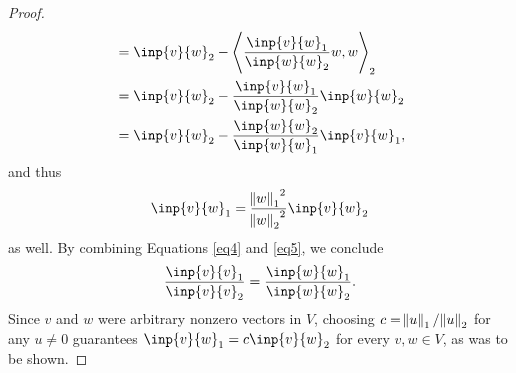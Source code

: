 \documentclass{extarticle}
\begin{document}
\begin{proof}
\begin{align*}
&= \inp{v}{w}_2 - \left\langle \frac{\inp{v}{w}_1}{\inp{w}{w}_2}w, w \right\rangle_2\\
&= \inp{v}{w}_2 - \frac{\inp{v}{w}_1}{\inp{w}{w}_2}\inp{w}{w}_2\\
&= \inp{v}{w}_2 - \frac{\inp{w}{w}_2}{\inp{w}{w}_1}\inp{v}{w}_1,
\end{align*}
and thus
\begin{equation}
\inp{v}{w}_1 = \frac{{\norm{w}_1}^2 }{{\norm{w}_2}^2}\inp{v}{w}_2 \label{eq5}
\end{equation}
as well.  By combining Equations \eqref{eq4} and \eqref{eq5}, we conclude 
\begin{equation*}
 \frac{\inp{v}{v}_1}{\inp{v}{v}_2} =  \frac{\inp{w}{w}_1}{\inp{w}{w}_2}.
\end{equation*}
Since $v$ and $w$ were arbitrary nonzero vectors in $V$, choosing $c = \norm{u}_1/\norm{u}_2$ for any $u\neq 0$ guarantees $\inp{v}{w}_1 = c\inp{v}{w}_2$ for every $v,w\in V$, as was to be shown.
\end{proof}
\end{document}
